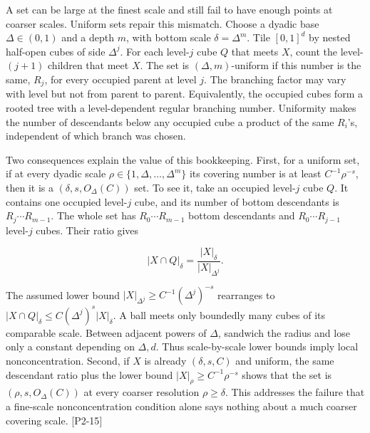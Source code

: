 A set can be large at the finest scale and still fail to have enough points at coarser scales. Uniform sets repair this mismatch. Choose a dyadic base \(\Delta\in(0,1)\) and a depth \(m\), with bottom scale \(\delta=\Delta^m\). Tile \([0,1]^d\) by nested half-open cubes of side \(\Delta^j\). For each level-\(j\) cube \(Q\) that meets \(X\), count the level-\((j+1)\) children that meet \(X\). The set is \((\Delta,m)\)-uniform if this number is the same, \(R_j\), for every occupied parent at level \(j\). The branching factor may vary with level but not from parent to parent. Equivalently, the occupied cubes form a rooted tree with a level-dependent regular branching number. Uniformity makes the number of descendants below any occupied cube a product of the same \(R_i\)'s, independent of which branch was chosen.

Two consequences explain the value of this bookkeeping. First, for a uniform set, if at every dyadic scale \(\rho\in\{1,\Delta,\ldots,\Delta^m\}\) its covering number is at least \(C^{-1}\rho^{-s}\), then it is a \((\delta,s,O_\Delta(C))\) set. To see it, take an occupied level-\(j\) cube \(Q\). It contains one occupied level-\(j\) cube, and its number of bottom descendants is \(R_j\cdots R_{m-1}\). The whole set has \(R_0\cdots R_{m-1}\) bottom descendants and \(R_0\cdots R_{j-1}\) level-\(j\) cubes. Their ratio gives

\[|X\cap Q|_\delta=\frac{|X|_\delta}{|X|_{\Delta^j}}.\]

The assumed lower bound \(|X|_{\Delta^j}\ge C^{-1}(\Delta^j)^{-s}\) rearranges to \(|X\cap Q|_\delta\le C(\Delta^j)^s|X|_\delta\). A ball meets only boundedly many cubes of its comparable scale. Between adjacent powers of \(\Delta\), sandwich the radius and lose only a constant depending on \(\Delta,d\). Thus scale-by-scale lower bounds imply local nonconcentration. Second, if \(X\) is already \((\delta,s,C)\) and uniform, the same descendant ratio plus the lower bound \(|X|_\rho\ge C^{-1}\rho^{-s}\) shows that the set is \((\rho,s,O_\Delta(C))\) at every coarser resolution \(\rho\ge\delta\). This addresses the failure that a fine-scale nonconcentration condition alone says nothing about a much coarser covering scale. {[}P2-15{]}

